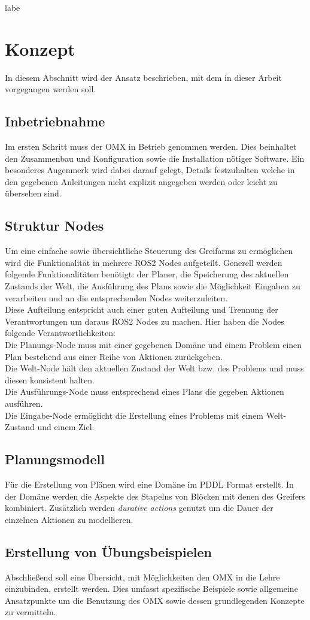 labe\section{Konzept}{\label{konzept}}
In diesem Abschnitt wird der Ansatz beschrieben, mit dem in dieser Arbeit vorgegangen werden soll.
\subsection{Inbetriebnahme}
Im ersten Schritt muss der OMX in Betrieb genommen werden. Dies beinhaltet den Zusammenbau und Konfiguration sowie die Installation nötiger Software. Ein besonderes Augenmerk wird dabei darauf gelegt,  Details festzuhalten welche in den gegebenen Anleitungen nicht explizit angegeben werden oder leicht zu übersehen sind.
\subsection{Struktur Nodes}{\label{konzept:nodes}}
Um eine einfache sowie übersichtliche Steuerung des Greifarms zu ermöglichen wird die Funktionalität in mehrere ROS2 Nodes aufgeteilt. Generell werden folgende Funktionalitäten benötigt: der Planer, die Speicherung des aktuellen Zustands der Welt, die Ausführung des Plans sowie die Möglichkeit Eingaben zu verarbeiten und an die entsprechenden Nodes weiterzuleiten.\\
Diese Aufteilung entspricht auch einer guten Aufteilung und Trennung der Verantwortungen um daraus ROS2 Nodes zu machen. Hier haben die Nodes folgende Verantwortlichkeiten:\\
Die Planungs-Node muss mit einer gegebenen Domäne und einem Problem einen Plan bestehend aus einer Reihe von Aktionen zurückgeben.\\
Die Welt-Node hält den aktuellen Zustand der Welt bzw. des Problems und muss diesen konsistent halten.\\
Die Ausführungs-Node muss entsprechend eines Plans die gegeben Aktionen ausführen.\\
Die Eingabe-Node ermöglicht die Erstellung eines Problems mit einem Welt-Zustand und einem Ziel.
\subsection{Planungsmodell}{\label{konzept:planningmodel}}
Für die Erstellung von Plänen wird eine Domäne im \ac{PDDL} Format erstellt. In der Domäne werden die Aspekte des Stapelns von Blöcken mit denen des Greifers kombiniert. Zusätzlich werden \emph{durative actions} genutzt um die Dauer der einzelnen Aktionen zu modellieren.
\subsection{Erstellung von Übungsbeispielen}{\label{konzept:exercise}}
Abschließend soll eine Übersicht, mit Möglichkeiten den OMX in die Lehre einzubinden,  erstellt werden. Dies umfasst spezifische Beispiele sowie allgemeine Ansatzpunkte um die Benutzung des OMX sowie dessen grundlegenden Konzepte zu vermitteln.